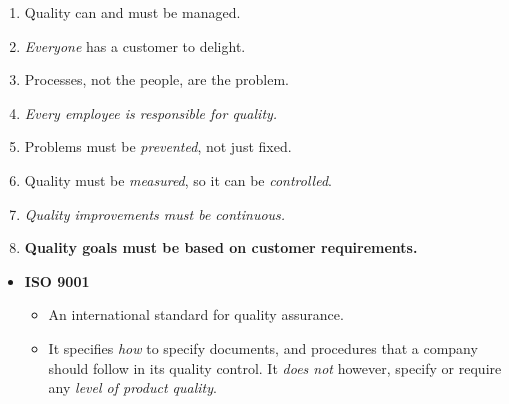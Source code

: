 \documentclass[a4paper]{article}
\providecommand{\tightlist}{%
  \setlength{\itemsep}{0pt}\setlength{\parskip}{0pt}}
\begin{document}
\begin{itemize}
  \begin{enumerate}
  \def\labelenumi{\arabic{enumi}.}
  \tightlist
  \item
    Quality can and must be managed.
  \item
    \emph{Everyone} has a customer to delight.
  \item
    Processes, not the people, are the problem.
  \item
    \emph{Every employee is responsible for quality.}
  \item
    Problems must be \emph{prevented}, not just fixed.
  \item
    Quality must be \emph{measured}, so it can be \emph{controlled}.
  \item
    \emph{Quality improvements must be continuous.}
  \item
    \textbf{Quality goals must be based on customer requirements.}
  \end{enumerate}
\end{itemize}

\begin{itemize}
\tightlist
\item
  \textbf{ISO 9001}

  \begin{itemize}
  \tightlist
  \item
    An international standard for quality assurance.
  \item
    It specifies \emph{how} to specify documents, and procedures that a
    company should follow in its quality control. It \emph{does not}
    however, specify or require any \emph{level of product quality}.
  \end{itemize}
\end{itemize}
\end{document}
